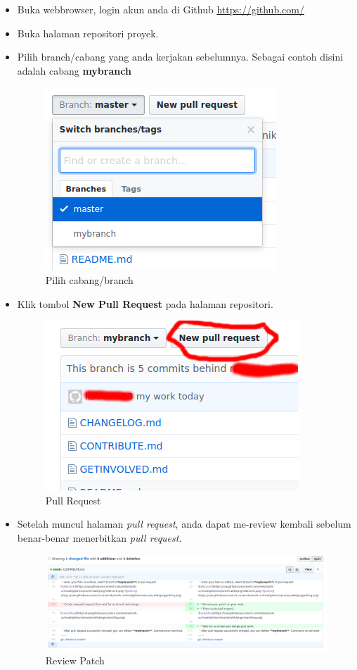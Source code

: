 \documentclass[12pt]{article}
\begin{document}
	\begin{itemize}
		\item Buka webbrowser, login akun anda di Github \url{https://github.com/}
		\item Buka halaman repositori proyek.
		\item Pilih branch/cabang yang anda kerjakan sebelumnya.
		Sebagai contoh disini adalah cabang \textbf{mybranch}
		\begin{figure}[h!]
			\centering
			\captionsetup{justification=centering}
			\includegraphics[width=0.5\linewidth]{../images/png/selbranch}
			\caption[Pilih Branch]{\small{Pilih cabang/branch}}
		\end{figure}
\newpage
		\item Klik tombol \textbf{New Pull Request} pada halaman repositori.
		\begin{figure}[h!]
			\centering
			\captionsetup{justification=centering}
			\includegraphics[width=0.5\linewidth]{../images/png/pullreq}
			\caption[Pull Request]{\small{Pull Request}}
		\end{figure}
	
		\item Setelah muncul halaman \textit{pull request}, anda dapat me-review kembali sebelum benar-benar menerbitkan \textit{pull request}.
		 \begin{figure}[h!]
		 	\centering
		 	\captionsetup{justification=centering}
		 	\includegraphics[width=1\linewidth]{../images/png/patchreview}
		 	\caption[Review Patch]{\small{Review Patch}}
		 \end{figure}
	 

\end{itemize}
\end{document}
